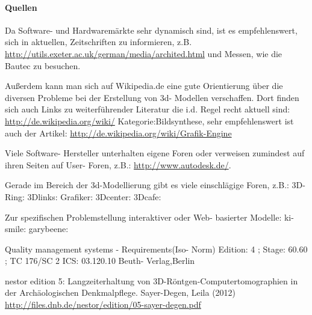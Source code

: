 \paragraph{Quellen}
\begin{flushleft}
Da Software- und Hardwaremärkte sehr dynamisch sind, ist es empfehlenswert, sich in aktuellen, Zeitschriften zu informieren, z.B. \url{http://utils.exeter.ac.uk/german/media/archited.html} und Messen, wie die Bautec zu besuchen. 

Außerdem kann man sich auf Wikipedia.de eine gute Orientierung über die diversen Probleme bei der Erstellung von 3d- Modellen verschaffen. Dort finden sich auch Links zu weiterführender Literatur die i.d. Regel recht aktuell sind: \url{http://de.wikipedia.org/wiki/} Kategorie:Bildsynthese, sehr empfehlenswert ist auch der Artikel: \url{http://de.wikipedia.org/wiki/Grafik-Engine} 

Viele Software- Hersteller unterhalten eigene Foren oder verweisen zumindest auf ihren Seiten auf User- Foren, z.B.: \url{http://www.autodesk.de/}. 

Gerade im Bereich der 3d-Modellierung gibt es viele einschlägige Foren, z.B.:
3D-Ring: 
3Dlinks:  
Grafiker: 
3Dcenter:  
3Dcafe: 

Zur spezifischen Problemstellung interaktiver oder Web- basierter Modelle: 
ki-smile:  
garybeene: 

Quality management systems - Requirements(Iso- Norm) Edition: 4 ; Stage: 60.60 ; TC 176/SC 2 ICS: 03.120.10 Beuth- Verlag,Berlin

nestor edition 5: Langzeiterhaltung von 3D-Röntgen-Computertomographien in der Archäologischen Denkmalpflege. Sayer-Degen, Leila (2012) \url{http://files.dnb.de/nestor/edition/05-sayer-degen.pdf}
\end{flushleft}
